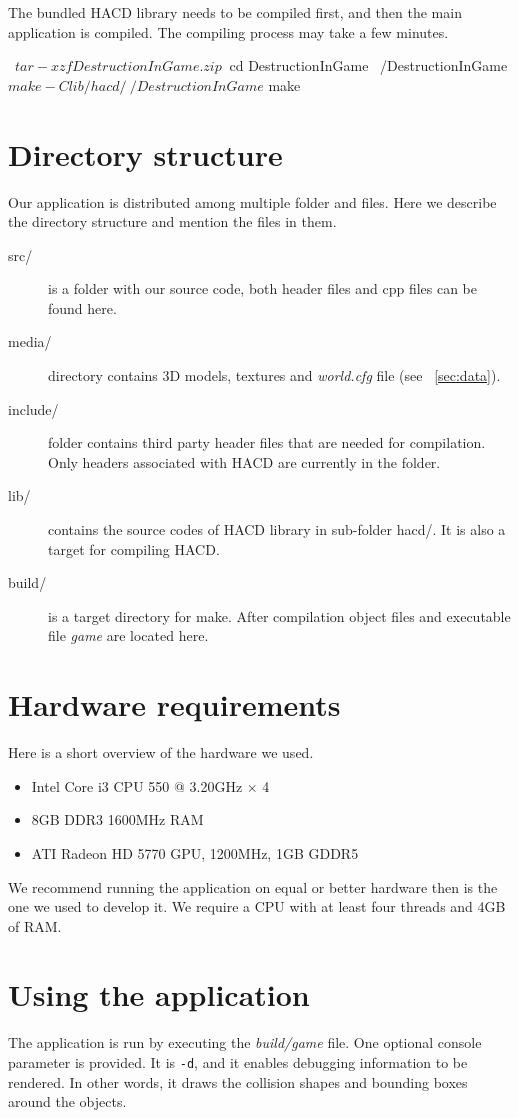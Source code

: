 The bundled HACD library needs to be compiled first, and then the main application is compiled. The compiling process may take a few minutes.
\begin{code}
~$ tar -xzf DestructionInGame.zip
~$ cd DestructionInGame
~/DestructionInGame$ make -C lib/hacd/
~/DestructionInGame$ make
\end{code}

\section{Directory structure}
Our application is distributed among multiple folder and files. Here we describe the directory structure and mention the files in them.
\begin{description}
\item[src/] is a folder with our source code, both header files and cpp files can be found here.
\item[media/] directory contains 3D models, textures and \emph{world.cfg}  file (see ~\cref{sec:data}).
\item[include/] folder contains third party header files that are needed for compilation. Only headers associated with HACD are currently in the folder.
\item[lib/] contains the source codes of HACD library in sub-folder hacd/. It is also a target for compiling HACD.
\item[build/] is a target directory for make. After compilation object files and executable file \emph{game} are located here. 
\end{description}

\section{Hardware requirements}
Here is a short overview of the hardware we used.
\begin{itemize}
\item Intel Core i3 CPU 550 @ 3.20GHz $\times$ 4 
\item 8GB DDR3 1600MHz RAM
\item ATI Radeon HD 5770 GPU, 1200MHz, 1GB GDDR5
\end{itemize}
We recommend running the application on equal or better hardware then is the one we used to develop it. We require a CPU with at least four threads and 4GB of RAM.

\section{Using the application}
The application is run by executing the \emph{build/game} file. One optional console parameter is provided. It is {\tt -d}, and it enables debugging information to be rendered. In other words, it draws the collision shapes and bounding boxes around the objects.
